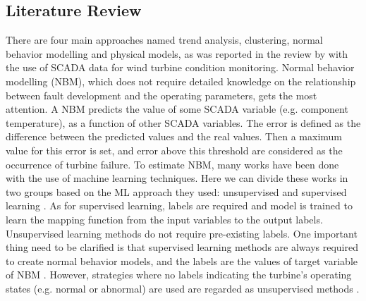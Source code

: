 \subsection{Literature Review}
There are four main approaches named trend analysis, clustering, normal behavior modelling and physical models, as was reported in the review by \cite{tautz2016using} with the use of SCADA data for wind turbine condition monitoring. Normal behavior modelling (NBM), which does not require detailed knowledge on the relationship between fault development and the operating parameters, gets the most attention. A NBM predicts the value of some SCADA variable (e.g. component temperature), as a function of other SCADA variables. The error is defined as the difference between the predicted values and the real values. Then a maximum value for this error is set, and error above this threshold are considered as the occurrence of turbine failure. To estimate NBM, many works have been done with the use of machine learning techniques. Here we can divide these works in two groups based on the ML approach they used: unsupervised and supervised learning \cite{shalev2014understanding}. As for supervised learning, labels are required and model is trained to learn the mapping function from the input variables to the output labels. Unsupervised learning methods do not require pre-existing labels. One important thing need to be clarified is that supervised learning methods are always required to create normal behavior models, and the labels are the values of target variable of NBM \cite{eriksson2020machine}. However, strategies where no labels indicating the turbine's operating states (e.g. normal or abnormal) are used are regarded as unsupervised methods \cite{helbing2018deep}.

